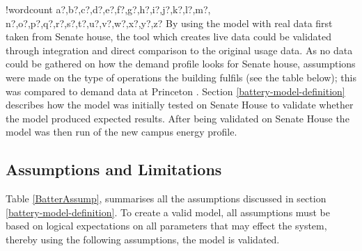 \documentclass[fontsize=9.5pt]{extarticle}
\numberwithin{figure}{section} %
\newcounter{words}
\newenvironment{counted}{%
  \setcounter{words}{0}
  \SearchList!{wordcount}{\stepcounter{words}}
    {a?,b?,c?,d?,e?,f?,g?,h?,i?,j?,k?,l?,m?,
    n?,o?,p?,q?,r?,s?,t?,u?,v?,w?,x?,y?,z?}
  \UndoBoundary{'}
  \SearchOrder{p;}}{%
  \StopSearching}
\begin{document}
\begin{counted}
By using the model with real data first taken from Senate house, the
tool which creates live data could be validated through integration and
direct comparison to the original usage data. As no data could be
gathered on how the demand profile looks for Senate house, assumptions
were made on the type of operations the building fulfils (see the table
below); this was compared to demand data at Princeton
\autocite{LiveData90:online}. Section \ref{battery-model-definition}
describes how the model was initially tested on Senate House to validate
whether the model produced expected results. After being validated on
Senate House the model was then run of the new campus energy profile.

\subsection{Assumptions and
Limitations}\label{assumptions-and-limitations}

Table \ref{BatterAssump}, summarises all the assumptions discussed in
section \ref{battery-model-definition}. To create a valid model, all
assumptions must be based on logical expectations on all parameters that
may effect the system, thereby using the following assumptions, the
model is validated.


\end{counted}
\end{document}
